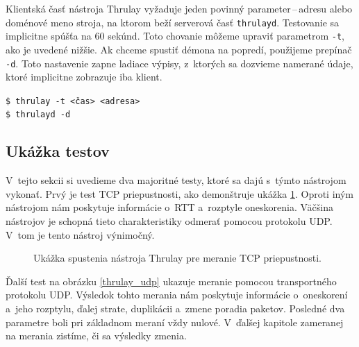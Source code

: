         \noindent Klientská časť nástroja Thrulay vyžaduje jeden povinný
        parameter\,--\,adresu alebo doménové meno stroja, na ktorom beží serverová časť
        \texttt{thrulayd}. Testovanie sa implicitne spúšťa na 60 sekúnd. Toto chovanie 
        môžeme upraviť parametrom \texttt{-t}, ako je uvedené nižšie.
        Ak chceme spustiť démona na popredí, použijeme prepínač
        \texttt{-d}. Toto nastavenie zapne ladiace výpisy, z~ktorých sa dozvieme
        namerané údaje, ktoré implicitne zobrazuje iba klient.
        \begin{flushleft}
            \texttt{\$ thrulay -t <čas> <adresa>} \\
            \texttt{\$ thrulayd -d}
        \end{flushleft}

        \subsection{Ukážka testov} \label{thrulay_testy}
        V~tejto sekcii si uvedieme dva majoritné testy, ktoré sa dajú
        s~týmto nástrojom vykonať. Prvý je test TCP priepustnosti, ako
        demonštruje ukážka \ref{thrulay_tcp}. Oproti 
        iným nástrojom nám poskytuje informácie o~RTT a~rozptyle oneskorenia.
        Väčšina nástrojov je schopná tieto charakteristiky odmerať pomocou
        protokolu UDP. V~tom je tento nástroj výnimočný.

       \begin{figure}[H]
           \begin{center}
                   \caption{Ukážka spustenia nástroja Thrulay pre meranie TCP 
                    priepustnosti.}
               \label{thrulay_tcp}
           \end{center}
       \end{figure}

\newpage

       Ďalší test na obrázku \ref{thrulay_udp}
       ukazuje meranie pomocou transportného protokolu UDP. Výsledok
       tohto merania nám poskytuje informácie o~oneskorení a~jeho rozptylu,
       ďalej strate, duplikácii a~zmene poradia paketov. Posledné 
       dva parametre boli pri základnom meraní vždy nulové. V~ďalšej
       kapitole zameranej na merania zistíme, či sa výsledky zmenia.

